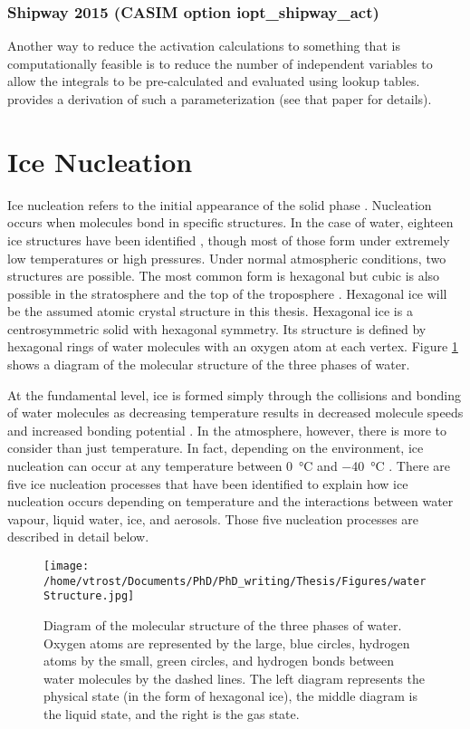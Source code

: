

\subsubsection{Shipway 2015 (CASIM option iopt\_shipway\_act)}
Another way to reduce the activation calculations to something that is computationally feasible is to reduce the number of independent variables to allow the integrals to be pre-calculated and evaluated using lookup tables. \cite{ship2015} provides a derivation of such a parameterization (see that paper for details).

\section{Ice Nucleation} \label{ch:iceNuc}
Ice nucleation refers to the initial appearance of the solid phase \citep{vali2015}. Nucleation occurs when molecules bond in specific structures. In the case of water, eighteen ice structures have been identified \citep{bai2012}, though most of those form under extremely low temperatures or high pressures. Under normal atmospheric conditions, two structures are possible. The most common form is hexagonal but cubic is also possible in the stratosphere and the top of the troposphere \citep{hobbs1974,murp2003}. Hexagonal ice will be the assumed atomic crystal structure in this thesis. Hexagonal ice is a centrosymmetric solid with hexagonal symmetry. Its structure is defined by hexagonal rings of water molecules with an oxygen atom at each vertex. \citep{hobbs1974} Figure \ref{fig:waterStructure} shows a diagram of the molecular structure of the three phases of water.

At the fundamental level, ice is formed simply through the collisions and bonding of water molecules as decreasing temperature results in decreased molecule speeds and increased bonding potential \citep{chal1959}. In the atmosphere, however, there is more to consider than just temperature. In fact, depending on the environment, ice nucleation can occur at any temperature between \SI{0}{\degreeCelsius} and \SI{-40}{\degreeCelsius} \citep{rog1989}. There are five ice nucleation processes that have been identified to explain how ice nucleation occurs depending on temperature and the interactions between water vapour, liquid water, ice, and aerosols. Those five nucleation processes are described in detail below.

\begin{figure}[H]
	\centering
	\texttt{[image: /home/vtrost/Documents/PhD/PhD\_writing/Thesis/Figures/waterStructure.jpg]}
	\caption{Diagram of the molecular structure of the three phases of water. Oxygen atoms are represented by the large, blue circles, hydrogen atoms by the small, green circles, and hydrogen bonds between water molecules by the dashed lines. The left diagram represents the physical state (in the form of hexagonal ice), the middle diagram is the liquid state, and the right is the gas state. \citep{waterStructure}}
	\label{fig:waterStructure}
\end{figure}

